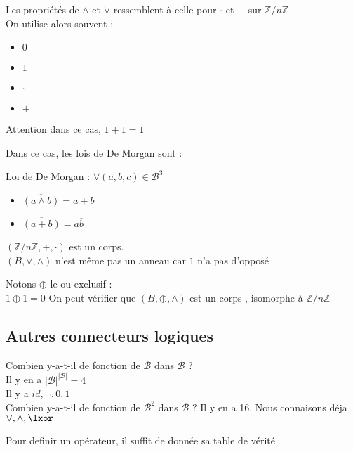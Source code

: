 Les propriétés de $\land$ et $\lor$ ressemblent à celle pour $\cdot$ et $+$ sur $\mathbb{Z}/n\mathbb{Z}$ \\

On utilise alors souvent : 
\begin{itemize}
    \item $0$
    \item $1$
    \item $\cdot$
    \item $+$
\end{itemize}

Attention dans ce cas, $1+1=1$

Dans ce cas, les lois de De Morgan sont :
\begin{th}
Loi de De Morgan : $\forall (a,b,c) \in \mathcal{B}^3$
\begin{itemize}
    \item $\overline{(a\land b)}= \overline a + \overline b$
    \item $\overline{(a + b)}= \overline a  \overline b$
\end{itemize}
\end{th}



\begin{rmq}
    $(\mathbb{Z}/n\mathbb{Z},+,\cdot)$ est un corps. \\
    $(B,\lor,\land)$ n'est même pas un anneau car $1$ n'a pas d'opposé
\end{rmq}

\begin{rmq}
    Notons $\oplus$ le ou exclusif : \\
    $1\oplus 1=0$
    On peut vérifier que $(B,\oplus,\land)$ est un corps , isomorphe à $\mathbb{Z}/n\mathbb{Z}$
\end{rmq}

\subsection{Autres connecteurs logiques}
Combien y-a-t-il de fonction de $\mathcal{B}$ dans $\mathcal{B}$ ? \\
Il y en a $|\mathcal{B}|^{|\mathcal{B}|}=4$ \\
Il y a $id,\lnot,0,1$ \\

Combien y-a-t-il de fonction de $\mathcal{B}^2$ dans $\mathcal{B}$ ?
Il y en a 16. Nous connaisons déja $\lor,\land,\lxor$

Pour definir un opérateur, il suffit de donnée sa table de vérité

